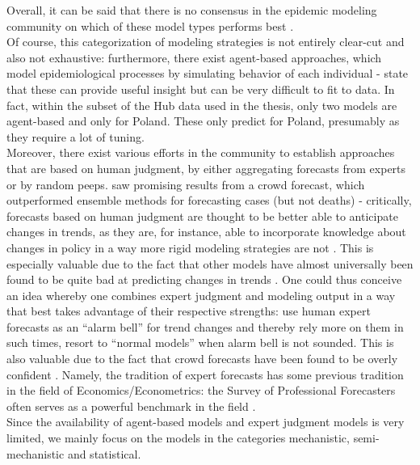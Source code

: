 Overall, it can be said that there is no consensus in the epidemic modeling community on which of these model types performs best \cite{moran_epidemic_2016}.\\
Of course, this categorization of modeling strategies is not entirely clear-cut and also not  exhaustive: furthermore, there exist agent-based approaches, which model epidemiological processes by simulating behavior of each individual - \cite{zelner_accounting_2021} state that these can provide useful insight but can be very difficult to fit to data. In fact, within the subset of the Hub data used in the thesis, only two models are agent-based and only for Poland. These only predict for Poland, presumably as they require a lot of tuning. \\
Moreover, there exist various efforts in the community to establish approaches that are based on human judgment, by either aggregating forecasts from experts or by random peeps. \cite{bosse_comparing_2021} saw promising results from a crowd forecast, which outperformed ensemble methods for forecasting cases (but not deaths) - critically, forecasts based on human judgment are thought to be better able to anticipate changes in trends, as they are, for instance, able to incorporate knowledge about changes in policy in a way more rigid modeling strategies are not \cite{bracher_evaluating_2021}. This is especially valuable due to the fact that other models have almost universally been found to be quite bad at predicting changes in trends . One could thus conceive an idea whereby one combines expert judgment and modeling output in a way that best takes advantage of their respective strengths: use human expert forecasts as an ``alarm bell'' for trend changes and thereby rely more on them in such times, resort to ``normal models'' when alarm bell is not sounded. This is also valuable due to the fact that crowd forecasts have been found to be overly confident \cite{bosse_comparing_2021}. Namely, the tradition of expert forecasts has some previous tradition in the field of Economics/Econometrics: the Survey of Professional Forecasters often serves as a powerful benchmark in the field .\\
Since the availability of agent-based models and expert judgment models is very limited, we mainly focus on the models in the categories mechanistic, semi-mechanistic and statistical. \\
